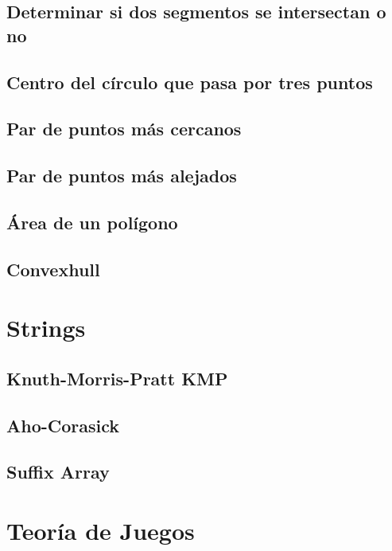 \documentclass[10pt,letterpaper,twocolumn,twosided]{article}
\begin{document}
\subsection{Determinar si dos segmentos se intersectan o no}

\subsection{Centro del círculo que pasa por tres puntos}

\subsection{Par de puntos más cercanos}

\subsection{Par de puntos más alejados}

\subsection{Área de un polígono}

\subsection{Convexhull}

\section{Strings}

\subsection{Knuth-Morris-Pratt KMP}

\subsection{Aho-Corasick}

\subsection{Suffix Array}

\section{Teoría de Juegos}
\end{document}
